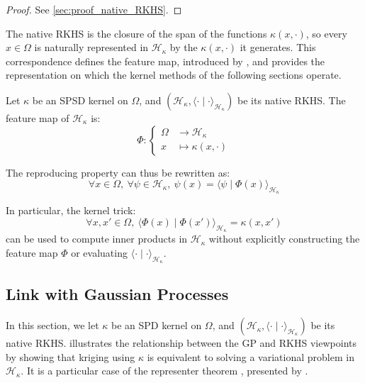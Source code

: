 \begin{proof}
	See \cref{sec:proof_native_RKHS}.
\end{proof}

The native RKHS is the closure of the span of the functions $\kappa(x,\cdot)$, so every $x\in\Omega$ is naturally represented in $\mathcal{H}_\kappa$ by the $\kappa(x,\cdot)$ it generates. This correspondence defines the feature map, introduced by , and provides the representation on which the kernel methods of the following sections operate.

\begin{definition}\label{th:feature_map}
	Let $\kappa$ be an SPSD kernel on $\Omega$, and $(\mathcal{H}_\kappa,\langle\cdot\mid\cdot\rangle_{\mathcal{H}_\kappa})$ be its native RKHS. The feature map of $\mathcal{H}_\kappa$ is:
	\begin{equation}
		\Phi:\left\{\begin{aligned}
		\Omega&\to\mathcal{H}_\kappa\\
		x&\mapsto \kappa(x,\cdot)
		\end{aligned}\right.
	\end{equation}

	The reproducing property can thus be rewritten as:
	\begin{equation}
		\forall x\in\Omega,\:\forall \psi\in\mathcal{H}_\kappa,\:\psi(x)=\langle \psi\mid\Phi(x)\rangle_{\mathcal{H}_\kappa}
	\end{equation}

	In particular, the kernel trick:
	\begin{equation}
		\forall x,x'\in\Omega,\:\langle\Phi(x)\mid\Phi(x')\rangle_{\mathcal{H}_\kappa}=\kappa(x,x')
	\end{equation}
	can be used to compute inner products in $\mathcal{H}_\kappa$ without explicitly constructing the feature map $\Phi$ or evaluating $\langle\cdot\mid\cdot\rangle_{\mathcal{H}_\kappa}$.
\end{definition}

\subsection{Link with Gaussian Processes}

In this section, we let $\kappa$ be an SPD kernel on $\Omega$, and $(\mathcal{H}_\kappa,\langle\cdot\mid\cdot\rangle_{\mathcal{H}_\kappa})$ be its native RKHS.  illustrates the relationship between the GP and RKHS viewpoints by showing that kriging using $\kappa$ is equivalent to solving a variational problem in $\mathcal{H}_\kappa$. It is a particular case of the representer theorem \cite{bib:representer,bib:representer-generalised}, presented by .

